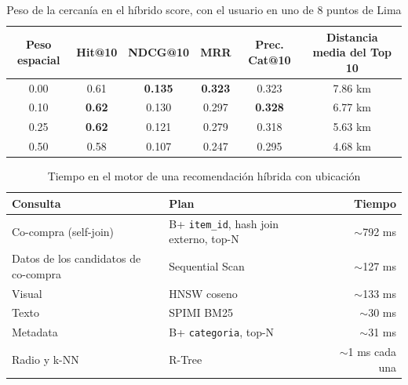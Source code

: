 \begin{table}[H]
\centering\small
\caption{Peso de la cercanía en el híbrido score, con el usuario en uno de 8 puntos de Lima}
\begin{tabular}{cccccc}
\toprule
Peso espacial & Hit@10 & NDCG@10 & MRR & Prec. Cat@10 & Distancia media del Top 10 \\
\midrule
0.00 & 0.61 & \textbf{0.135} & \textbf{0.323} & 0.323 & 7.86 km \\
0.10 & \textbf{0.62} & 0.130 & 0.297 & \textbf{0.328} & 6.77 km \\
0.25 & \textbf{0.62} & 0.121 & 0.279 & 0.318 & 5.63 km \\
0.50 & 0.58 & 0.107 & 0.247 & 0.295 & 4.68 km \\
\bottomrule
\end{tabular}
\end{table}

\begin{table}[H]
\centering\small
\caption{Tiempo en el motor de una recomendación híbrida con ubicación}
\begin{tabular}{llr}
\toprule
Consulta & Plan & Tiempo \\
\midrule
Co-compra (self-join) & B+ \texttt{item\_id}, hash join externo, top-N & $\sim$792 ms \\
Datos de los candidatos de co-compra & Sequential Scan & $\sim$127 ms \\
Visual & HNSW coseno & $\sim$133 ms \\
Texto & SPIMI BM25 & $\sim$30 ms \\
Metadata & B+ \texttt{categoria}, top-N & $\sim$31 ms \\
Radio y k-NN & R-Tree & $\sim$1 ms cada una \\
\bottomrule
\end{tabular}
\end{table}

